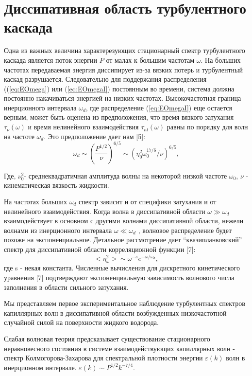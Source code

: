 \section{Диссипативная область турбулентного каскада}%
Одна из важных величина характерезующих стационарный спектр турбулентного каскада является поток энергии $P$ от малах к большим частотам $\omega$. На больших частотах передаваемая энергия диссипирует из-за вязких потерь и турбулентный каскад разрушается. Следовательно для поддержания распределения ((\ref{eq:EOmega}) или (\ref{eq:EOmegaI}) постоянным во времени, система должна постоянно накачиваться энергией на низких частотах. Высокочастотная граница инерционного интервала $\omega_d$, где распределение (\ref{eq:EOmegaI}) еще остается верным, может быть оценена из предположения, что время вязкого затухания $\tau_\nu(\omega)$ и время нелинейного взаимодействия $\tau_{nl}(\omega)$ равны по порядку для волн на частоте $\omega_d$. Это предположение дает нам [5]:
\begin{equation}
\omega_d	 \sim (\frac{P^{1/2}}{\nu})^{6/5} \sim (\eta_0^2\omega_0^{17/6}/\nu)^{6/5},
\end{equation}

Где, $\nu_0^2$- среднеквадратичная амплитуда волны на некоторой низкой частоте $\omega_0$, $\nu$ - кинематическая вязкость жидкости.

На частотах больших $\omega_d$ спектр зависит и от специфики затухания и от нелинейного взаимодействия. Когда волна в диссипативной области $\omega \gg \omega_d$ взаимодействует в основном с другими волнами диссипативной области, нежели волнами из инерционного интервала $\omega \ll \omega_d$ , волновое распределение будет похоже на экспоненциальное. Детальное рассмотрение дает “квазипланковский” спектр для диссипативной области корреляционной функции [7]:
\begin{equation}
<\eta_\omega^2> \sim \omega^{-s} e^{-\omega/\omega_d},
\end{equation}			
где s - некая константа. Численные вычисления для дискретного кинетического уравнения [7] подтверждают экспоненциальную зависимость волнового числа заполнения в области сильного затухания.
	
	Мы представляем первое экспериментальное наблюдение турбулентных спектров капиллярных волн в диссипативной области возбужденных низкочастотной случайной силой на поверхности жидкого водорода.


Слабая волновая теория предсказывает существование стационарного неравновесного состояния в системе взаимодействующих капиллярных волн - спектр Колмогорова-Захарова для спектральной плотности энергии $\varepsilon(k)$ волн в инерционном интервале. $\varepsilon(k) \sim P^{1/2}k^{-7/4}$.

